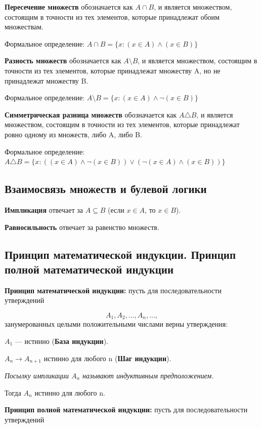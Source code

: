 \documentclass[a4paper, 10pt]{article}
\begin{document}
\textbf{Пересечение множеств} обозначается как $A \cap B$, и является множеством, состоящим в точности из тех элементов, которые принадлежат обоим множествам.

Формальное определение: $A \cap B = \{x \colon (x \in A) \wedge (x \in B)\}$

\textbf{Разность множеств} обозначается как $A \setminus B$, и является множеством, состоящим в точности из тех элементов, которые принадлежат множеству A, но не принадлежат множеству B.

Формальное определение: $A \setminus B = \{x \colon (x \in A) \wedge \neg (x \in B)\}$

\textbf{Симметрическая разница множеств} обозначается как $A \triangle B$, и является множеством, состоящим в точности из тех элементов, которые принадлежат ровно одному из множеств, либо A, либо B. 

Формальное определение: $A \triangle B = \{x \colon ((x \in A) \wedge \neg (x \in B)) \vee (\neg (x \in A) \wedge (x \in B))\}$


\subsection{Взаимосвязь множеств и булевой логики}

\textbf{Импликация} отвечает за $A \subseteq B$ (если $x \in A$, то $x \in B$).

\textbf{Равносильность} отвечает за равенство множеств.


\subsection{Принцип математической индукции. Принцип полной математической индукции}

\textbf{Принцип математической индукции:} пусть для последовательности утверждений

$$A_1, A_2, ..., A_n, ...,$$ занумерованных целыми положительными числами верны утверждения:

$A_1$ --- истинно (\textbf{База индукции}).

$A_n \to A_{n + 1}$ истинно для любого n (\textbf{Шаг индукции}). 

\textit{Посылку импликации $A_n$ называют индуктивным предположением.}

Тогда $A_n$ истинно для любого n.


\textbf{Принцип полной математической индукции:} пусть для последовательности утверждений
\end{document}
